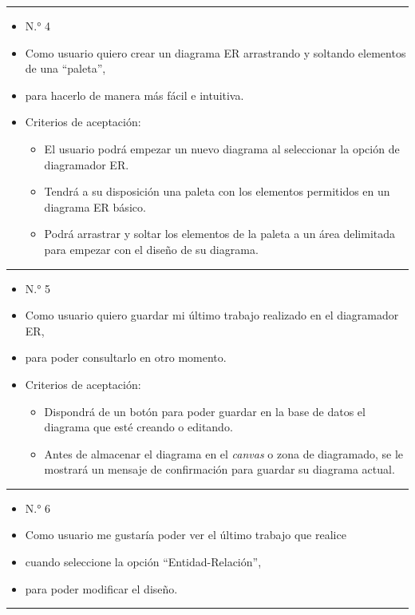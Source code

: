 \noindent\rule{\textwidth}{1pt}
\begin{itemize}
	\item N.° 4
	\item Como usuario quiero crear un diagrama ER arrastrando y soltando elementos de una ``paleta'',
	\item para hacerlo de manera más fácil e intuitiva.
	\item Criterios de aceptación:
	\begin{itemize}
		\item El usuario podrá empezar un nuevo diagrama al seleccionar la opción de diagramador ER.
		\item Tendrá a su disposición una paleta con los elementos permitidos en un diagrama ER básico.
		\item Podrá arrastrar y soltar los elementos de la paleta a un área delimitada para empezar con el diseño de su diagrama.
	\end{itemize}
\end{itemize}
\noindent\rule{\textwidth}{1pt}
\begin{itemize}
	\item N.° 5
	\item Como usuario quiero guardar mi último trabajo realizado en el diagramador ER,
	\item para poder consultarlo en otro momento.
	\item Criterios de aceptación:
	\begin{itemize}
		\item Dispondrá de un botón para poder guardar en la base de datos el diagrama que esté creando o editando.
		\item Antes de almacenar el diagrama en el \textit{canvas} o zona de diagramado, se le mostrará un mensaje de confirmación para guardar su diagrama actual.
	\end{itemize}
\end{itemize}
\noindent\rule{\textwidth}{1pt}
\begin{itemize}
	\item N.° 6
	\item Como usuario me gustaría poder ver el último trabajo que realice
	\item cuando seleccione la opción ``Entidad-Relación'',
	\item para poder modificar el diseño.
\end{itemize}
\noindent\rule{\textwidth}{1pt}
